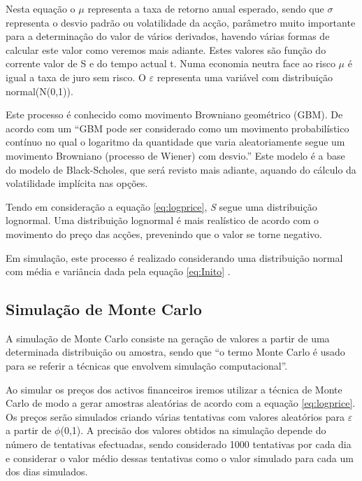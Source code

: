 \documentclass[
  12pt,
  a4paper,
  openany]{book}
\begin{document}
Nesta equação o \(\mu\) representa a taxa de retorno anual esperado, sendo que \(\sigma\) representa o desvio padrão ou volatilidade da acção, parâmetro muito importante para a determinação do valor de vários derivados, havendo várias formas de calcular este valor como veremos mais adiante. Estes valores são função do corrente valor de S e do tempo actual t. Numa economia neutra face ao risco \(\mu\) é igual a taxa de juro sem risco. O \(\varepsilon\) representa uma variável com distribuição normal(N(0,1)).

Este processo é conhecido como movimento Browniano geométrico (GBM). De acordo com \citet{AppliedFinancial} um ``GBM pode ser considerado como um movimento probabilístico contínuo no qual o logaritmo da quantidade que varia aleatoriamente segue um movimento Browniano (processo de Wiener) com desvio.'' Este modelo é a base do modelo de Black-Scholes, que será revisto mais adiante, aquando do cálculo da volatilidade implícita nas opções.

Tendo em consideração a equação \eqref{eq:logprice}, \emph{S} segue uma distribuição lognormal. Uma distribuição lognormal é mais realístico de acordo com o movimento do preço das acções, prevenindo que o valor se torne negativo.

Em simulação, este processo é realizado considerando uma distribuição normal com média e variância dada pela equação \eqref{eq:Inito} \citep{FRM1}.

\hypertarget{simulauxe7uxe3o-de-monte-carlo}{%
\subsection{Simulação de Monte Carlo}\label{simulauxe7uxe3o-de-monte-carlo}}

A simulação de Monte Carlo consiste na geração de valores a partir de uma determinada distribuição ou amostra, sendo que ``o termo Monte Carlo é usado para se referir a técnicas que envolvem simulação computacional''\citep[pp.457]{ProgSim}.

Ao simular os preços dos activos financeiros iremos utilizar a técnica de Monte Carlo de modo a gerar amostras aleatórias de acordo com a equação \eqref{eq:logprice}. Os preços serão simulados criando várias tentativas com valores aleatórios para \(\varepsilon\) a partir de \(\phi\)(0,1). A precisão dos valores obtidos na simulação depende do número de tentativas efectuadas, sendo considerado 1000 tentativas por cada dia e considerar o valor médio dessas tentativas como o valor simulado para cada um dos dias simulados.
\end{document}
